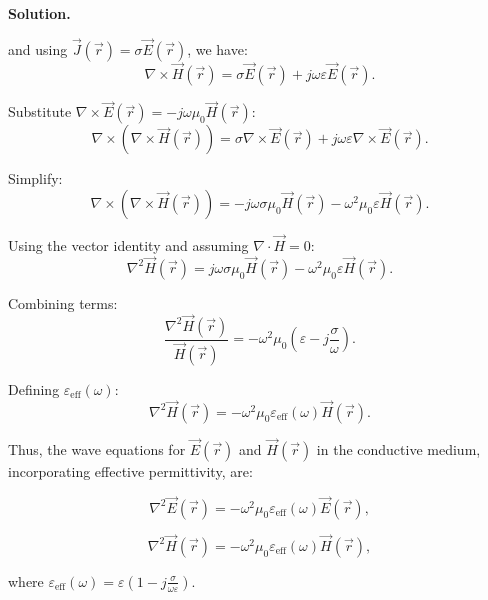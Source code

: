 \documentclass[12pt, a4paper, oneside]{report}
\newenvironment{solution}{
  \par\medskip\noindent
  \textbf{Solution.}\quad\itshape
  \par\noindent\makebox[\linewidth]{\rule{\textwidth}{0.4pt}}
}{
  \par\noindent\makebox[\linewidth]{\rule{\textwidth}{0.4pt}}
  \par\medskip
}
\begin{document}
\begin{solution}
and using \(\vec{J}(\vec{r}) = \sigma \vec{E}(\vec{r})\), we have:
\[
\nabla \times \vec{H}(\vec{r}) = \sigma \vec{E}(\vec{r}) + j\omega \varepsilon \vec{E}(\vec{r}).
\]

Substitute \(\nabla \times \vec{E}(\vec{r}) = -j\omega \mu_0 \vec{H}(\vec{r})\):
\[
\nabla \times (\nabla \times \vec{H}(\vec{r})) = \sigma \nabla \times \vec{E}(\vec{r}) + j\omega \varepsilon \nabla \times \vec{E}(\vec{r}).
\]

Simplify:
\[
\nabla \times (\nabla \times \vec{H}(\vec{r})) = -j\omega \sigma \mu_0 \vec{H}(\vec{r}) - \omega^2 \mu_0 \varepsilon \vec{H}(\vec{r}).
\]

Using the vector identity and assuming \(\nabla \cdot \vec{H} = 0\):
\[
\nabla^2 \vec{H}(\vec{r}) = j\omega \sigma \mu_0 \vec{H}(\vec{r}) - \omega^2 \mu_0 \varepsilon \vec{H}(\vec{r}).
\]

Combining terms:
\[
\frac{\nabla^2 \vec{H}(\vec{r})}{\vec{H}(\vec{r})} = -\omega^2 \mu_0 \left( \varepsilon - j\frac{\sigma}{\omega} \right).
\]

Defining \(\varepsilon_{\text{eff}}(\omega)\):
\[
\nabla^2 \vec{H}(\vec{r}) = -\omega^2 \mu_0 \varepsilon_{\text{eff}}(\omega) \vec{H}(\vec{r}).
\]

Thus, the wave equations for \(\vec{E}(\vec{r})\) and \(\vec{H}(\vec{r})\) in the conductive medium, incorporating effective permittivity, are:

\[
\nabla^2 \vec{E}(\vec{r}) = -\omega^2 \mu_0 \varepsilon_{\text{eff}}(\omega) \vec{E}(\vec{r}),
\]

\[
\nabla^2 \vec{H}(\vec{r}) = -\omega^2 \mu_0 \varepsilon_{\text{eff}}(\omega) \vec{H}(\vec{r}),
\]

where \(\varepsilon_{\text{eff}}(\omega) = \varepsilon \left(1 - j \frac{\sigma}{\omega \varepsilon} \right)\).
\end{solution}
\end{document}
